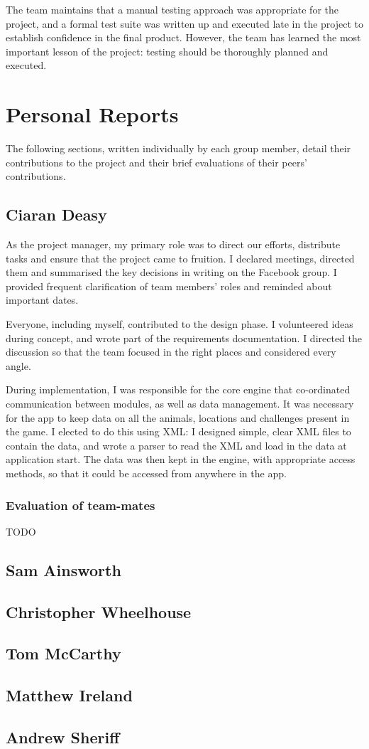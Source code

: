 \documentclass[12pt,a4paper,twoside]{article}
\begin{document}
The team maintains that a manual testing approach was appropriate for the project, and a formal test suite was written up and executed late in the project to establish confidence in the final product. 
However, the team has learned the most important lesson of the project: testing should be thoroughly planned and executed.

\section{Personal Reports}

The following sections, written individually by each group member, detail their contributions to the project and their brief evaluations of their peers' contributions. 

\subsection{Ciaran Deasy}

As the project manager, my primary role was to direct our efforts, distribute tasks and ensure that the project came to fruition. I declared meetings, directed them and summarised the key decisions in writing on the Facebook group. I provided frequent clarification of team members' roles and reminded about important dates.

Everyone, including myself, contributed to the design phase. I volunteered ideas during concept, and wrote part of the requirements documentation. I directed the discussion so that the team focused in the right places and considered every angle.

During implementation, I was responsible for the core engine that co-ordinated communication between modules, as well as data management. It was necessary for the app to keep data on all the animals, locations and challenges present in the game. I elected to do this using XML: I designed simple, clear XML files to contain the data, and wrote a parser to read the XML and load in the data at application start. The data was then kept in the engine, with appropriate access methods, so that it could be accessed from anywhere in the app.

\subsubsection{Evaluation of team-mates}

TODO

\subsection{Sam Ainsworth}

\subsection{Christopher Wheelhouse}

\subsection{Tom McCarthy}

\subsection{Matthew Ireland}

\subsection{Andrew Sheriff}
\end{document}
